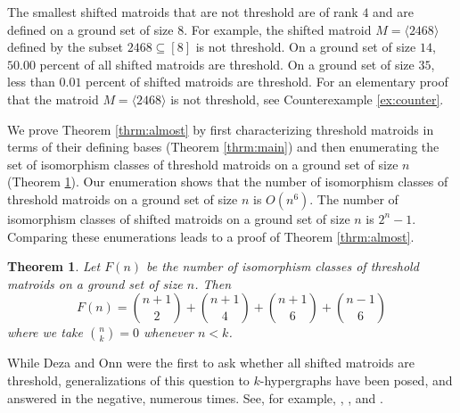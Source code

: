 \documentclass[10pt,a4paper]{amsart}
\makeatletter
\let\laneX@cite\cite
\renewcommand{\cite}{\protect\laneX@citenew}
\newcommand{\laneX@citenew}{\@ifnextchar[{\laneX@cite@a}{\laneX@cite@b}}
\def\laneX@cite@b#1{\laneX@cite{#1}}
\def\laneX@cite@a[#1]{\@ifnextchar[{\laneX@cite@c{#1}}{\laneX@cite@d{#1}}}
\def\laneX@cite@d#1#2{\laneX@cite[#1]{#2}}
\def\laneX@cite@c#1[#2]#3{[\unskip #1 \csname b@#3\endcsname, #2]}
\theoremstyle{definition}
\theoremstyle{plain}
\newtheorem{mainthrm}{Theorem}
\makeatother
\begin{document}
The smallest shifted matroids that are not threshold are of rank $4$ and are defined on a ground set of size $8$. For example, the shifted matroid $M= \langle 2468 \rangle$ defined by the subset $2468 \subseteq [8]$ is not threshold. On a ground set of size $14$, $50.00$ percent of all shifted matroids are threshold. On a ground set of size $35$, less than $0.01$ percent of shifted matroids are threshold. For an elementary proof that the matroid $M=\langle 2468\rangle$ is not threshold, see Counterexample \ref{ex:counter}.

We prove Theorem \ref{thrm:almost} by first characterizing threshold matroids in terms of their defining bases (Theorem \ref{thrm:main}) and then enumerating the set of isomorphism classes of threshold matroids on a ground set of size $n$ (Theorem \ref{thrm:enumeration}). Our enumeration shows that the number of isomorphism classes of threshold matroids on a ground set of size $n$ is $O(n^6)$. The number of isomorphism classes of shifted matroids on a ground set of size $n$ is $2^n-1$. Comparing these enumerations leads to a proof of Theorem \ref{thrm:almost}.

\begin{mainthrm}
  \label{thrm:enumeration}
Let $F(n)$ be the number of isomorphism classes of threshold matroids on a ground set of size $n$. Then
\[F(n) = \binom{n+1}{2} + \binom{n+1}{4}+ \binom{n+1}{6} + \binom{n-1}{6}\]
where we take $\binom{n}{k}=0$ whenever $n<k$.
\end{mainthrm}

While Deza and Onn were the first to ask whether all shifted matroids are threshold, generalizations of this question to $k$-hypergraphs have been posed, and answered in the negative, numerous times. See, for example,  \cite[Theorem $3.1$]{KR}, \cite[Example $2.2$]{RRST}, \cite[Theorem $7.3.3$]{Muroga} and \cite[Example $2.15$]{BS}. 
\end{document}
